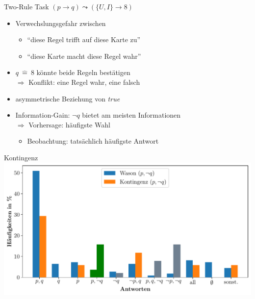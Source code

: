 \begin{frame}{Two-Rule Task {\scriptsize \cite[S.~102-104]{stenningHumanReasoningCognitive2008}}}
    $(p \to q) \leadsto (\{U, I\} \to 8)$

    \begin{itemize}
        \item Verwechslungsgefahr zwischen
        \begin{itemize}
            \item \enquote{diese Regel trifft auf diese Karte zu}
            \item \enquote{diese Karte macht diese Regel wahr}
        \end{itemize}
        
        \item $q~\hat=~8$ könnte beide Regeln bestätigen \\
            $\Rightarrow$ Konflikt: eine Regel wahr, eine falsch
        
        \item asymmetrische Beziehung von \emph{true}
        
        \item Information-Gain: $\lnot q$ bietet am meisten Informationen \\
            $\Rightarrow$ Vorhersage: häufigste Wahl
        \begin{itemize}
            \item Beobachtung: tatsächlich häufigste Antwort
        \end{itemize}
    \end{itemize}
\end{frame}


\begin{frame}{Kontingenz {\scriptsize \cite[S.~109]{stenningHumanReasoningCognitive2008}}}
    \includegraphics[width=\textwidth]{../plot/results_contingency.pdf}
\end{frame}


